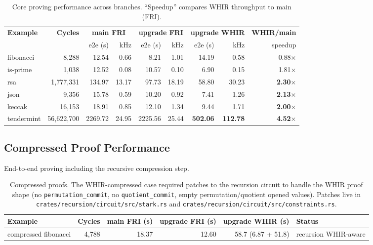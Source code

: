 \begin{table}[h]
\centering
\small
\begin{tabular}{lrrrrrrrr}
\toprule
\textbf{Example} & \textbf{Cycles} & \multicolumn{2}{c}{\textbf{main FRI}} & \multicolumn{2}{c}{\textbf{upgrade FRI}} & \multicolumn{2}{c}{\textbf{upgrade WHIR}} & \textbf{WHIR/main} \\
 & & e2e (s) & kHz & e2e (s) & kHz & e2e (s) & kHz & speedup \\
\midrule
fibonacci   & 8{,}288       & 12.54   & 0.66  & 8.21    & 1.01  & 14.19  & 0.58   & 0.88$\times$ \\
is-prime    & 1{,}038       & 12.52   & 0.08  & 10.57   & 0.10  & 6.90   & 0.15   & 1.81$\times$ \\
rsa         & 1{,}777{,}331 & 134.97  & 13.17 & 97.73   & 18.19 & 58.80  & 30.23  & \textbf{2.30$\times$} \\
json        & 9{,}356       & 15.78   & 0.59  & 10.20   & 0.92  & 7.41   & 1.26   & \textbf{2.13$\times$} \\
keccak      & 16{,}153      & 18.91   & 0.85  & 12.10   & 1.34  & 9.44   & 1.71   & \textbf{2.00$\times$} \\
tendermint  & 56{,}622{,}700 & 2269.72 & 24.95 & 2225.56 & 25.44 & \textbf{502.06} & \textbf{112.78} & \textbf{4.52$\times$} \\
\bottomrule
\end{tabular}
\caption{Core proving performance across branches. ``Speedup'' compares WHIR throughput to main (FRI).}
\label{tab:core-perf}
\end{table}

\subsection{Compressed Proof Performance}

End-to-end proving including the recursive compression step.

\begin{table}[h]
\centering
\small
\begin{tabular}{lrrrrl}
\toprule
\textbf{Example} & \textbf{Cycles} & \textbf{main FRI (s)} & \textbf{upgrade FRI (s)} & \textbf{upgrade WHIR (s)} & \textbf{Status} \\
\midrule
compressed fibonacci & 4{,}788 & 18.37 & 12.60 & 58.7 (6.87 + 51.8) & recursion WHIR-aware \\
\bottomrule
\end{tabular}
\caption{Compressed proofs. The WHIR-compressed case required patches to the
recursion circuit to handle the WHIR proof shape
(no \texttt{permutation\_commit}, no \texttt{quotient\_commit}, empty
permutation/quotient opened values). Patches live in
\texttt{crates/recursion/circuit/src/stark.rs} and
\texttt{crates/recursion/circuit/src/constraints.rs}.}
\label{tab:compressed-perf}
\end{table}

